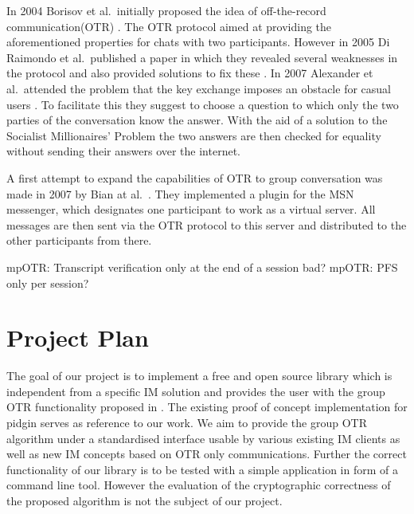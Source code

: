In 2004 Borisov et al.\ initially proposed the idea of off-the-record
communication(OTR) \cite{otr}. The OTR protocol aimed at providing the
aforementioned properties for chats with two participants. However in 2005 Di
Raimondo et al.\ published a paper in which they revealed several weaknesses in
the protocol and also provided solutions to fix these \cite{sec-otr}. In 2007
Alexander et al.\ attended the problem that the key exchange imposes an obstacle
for casual users \cite{auth-otr}. To facilitate this they suggest to choose a question to which
only the two parties of the conversation know the answer. With the aid of a solution
to the Socialist Millionaires’ Problem the two answers are then checked for equality without sending their answers over the internet.

A first attempt to expand the capabilities of OTR to group conversation was made in 2007 by Bian at al.\ \cite{gotr}. They implemented a plugin for the MSN messenger, which designates one participant to work as a virtual server. All messages are then sent via the OTR protocol to this server and distributed to the other participants from there.


mpOTR: Transcript verification only at the end of a session bad?
mpOTR: PFS only per session?

\section{Project Plan}

The goal of our project is to implement a free and open source library which is
independent from a specific IM solution and provides the user with the group OTR
functionality proposed in \cite{impr-gotr}. The existing proof of concept
implementation for pidgin serves as reference to our work. We aim to provide the
group OTR algorithm under a standardised interface usable by various existing IM
clients as well as new IM concepts based on OTR only communications. Further the
correct functionality of our library is to be tested with a simple application in form of a command line tool.
However the evaluation of the cryptographic correctness of the proposed
algorithm is not the subject of our project.

